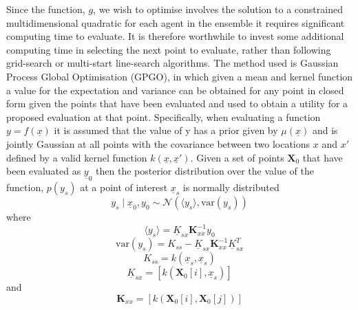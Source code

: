 \documentclass[a4paper, 10 pt, conference]{ieeeconf}  %
\begin{document}
Since the function, $g$, we wish to optimise involves the solution to a constrained multidimensional quadratic for each agent in the ensemble it requires significant computing time to evaluate. It is therefore worthwhile to invest some additional computing time in selecting the next point to evaluate, rather than following grid-search or multi-start line-search algorithms. The method used is Gaussian Process Global Optimisation (GPGO)\cite{garnettgaussian}, in which given a mean and kernel function a value for the expectation and variance can be obtained for any point in closed form given the points that have been evaluated and used to obtain a utility for a proposed evaluation at that point.
Specifically, when evaluating a function $y=f(\underline{x})$  it is assumed that the value of y has a prior given by $\mu (\underline{x})$ and is jointly Gaussian at all points with the covariance between two locations $x$ and $x'$ defined by a valid kernel function $k(\underline{x},\underline{x}')$. Given a set of points $\mathbf{X}_{0}$ that have been evaluated as $\underline{y}_{0}$ then the posterior distribution over the value of the function, $p(y_{s})$ at a point of interest $\underline{x}_s$ is normally distributed
\begin{equation}
 y_{s}\mid \underline{x}_{0},y_{0}\sim\mathcal{N}\left( \langle y_{s}\rangle ,\mathrm{var}(y_{s})\right)
\end{equation}
where
\begin{equation}
\langle y_{s}\rangle 	=\underline{K}_{sx}\mathbf{K}_{xx}^{-1}y_{0}
\end{equation}
\begin{equation}
\mathrm{var}\left(y_{s}\right)	=K_{ss}-\underline{K}_{sx} \mathbf{K}_{xx}^{-1} \underline{K}_{sx}^{T}
\end{equation}
\begin{equation}
K_{ss}	= k(\underline{x}_s,\underline{x}_s)
\end{equation}
\begin{equation}
\underline{K}_{sx}	=[k\left(\mathbf{X}_{0}[i],\underline{x}_s\right)]
\end{equation}
and
\begin{equation}
\mathbf{K}_{xx}	=[k\left(\mathbf{X}_{0}[i],\mathbf{X}_{0}[j]\right)]
\end{equation}
\end{document}
